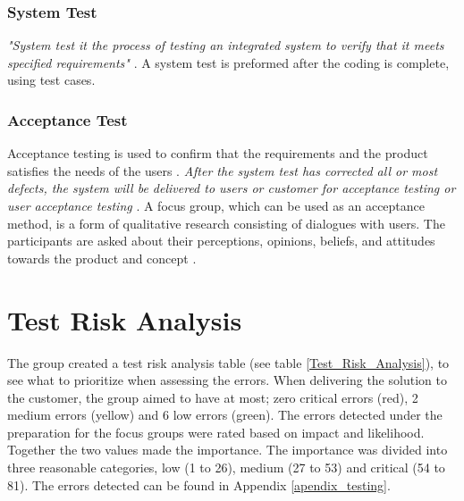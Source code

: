 \subsubsection{System Test}
\textit{"System test it the process of testing an integrated system to verify that it meets specified requirements"} \cite{systemTest}. A system test is preformed after the coding is complete, using test cases. 

\subsubsection{Acceptance Test}
Acceptance testing is used to confirm that the requirements and the product satisfies the needs of the users \cite{acceptanceTesting}. \textit{After the system test has corrected all or most defects, the system will be delivered to users or customer for acceptance testing or user acceptance testing} \cite{acceptanceTestingDefinition}. A focus group, which can be used as an acceptance method, is a form of qualitative research consisting of dialogues with users. The participants are asked about their perceptions, opinions, beliefs, and attitudes towards the product and concept \cite{focusGroup}.


\section{Test Risk Analysis}
The group created a test risk analysis table (see table \ref{Test_Risk_Analysis}), to see what to prioritize when assessing the errors. When delivering the solution to the customer, the group aimed to have at most; zero critical errors (red), 2 medium errors (yellow) and 6 low errors (green). The errors detected under the preparation for the focus groups were rated based on impact and likelihood. Together the two values made the importance. The importance was divided into three reasonable categories, low (1 to 26), medium (27 to 53) and critical (54 to 81). The errors detected can be found in Appendix \ref{apendix_testing}.


